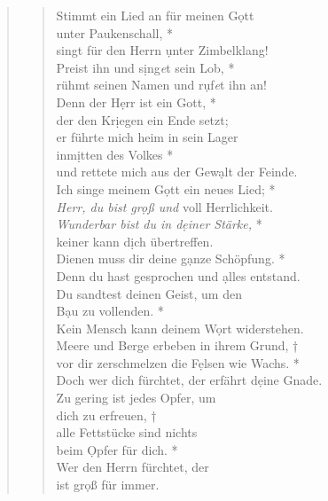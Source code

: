 \begin{quote}
\begin{verse}

Stimmt ein Lied an für meinen G\d ott\\
unter Paukenschall, *\\ 
\vin singt für den Herrn \d unter Zimbelklang! \\ 
\vin Preist ihn und s\d ing\textit{e}t sein Lob, *\\  
rühmt seinen Namen und r\d uf\textit{e}t ihn an! \\
Denn der H\d err ist ein Gott, *\\ 
der den Kr\d iegen ein Ende setzt; \\ 
\vin er führte mich heim in sein Lager\\ 
\vin inm\d itten des Volkes *\\ 
\vin  und rettete mich aus der Gew\d alt der Feinde.\\  
Ich singe meinem G\d ott ein neues Lied; *\\ 
\textit{Herr, du bist gr\d oß und} voll Herrlichkeit.\\ 
\vin \textit{Wunderbar bist du in d\d einer Stärke,} *\\ 
\vin keiner kann d\d ich übertreffen.\\  
Dienen muss dir deine g\d anze Schöpfung. *\\ 
Denn du hast gesprochen und \d alles entstand.\\ 
\vin Du sandtest deinen Geist, um den \\ \vin B\d au zu vollenden.  *\\ 
\vin  Kein Mensch kann deinem W\d ort widerstehen.\\ 
Meere und Berge erbeben in ihrem Grund, †\\
vor dir zerschmelzen die F\d elsen wie Wachs. *\\  
Doch wer dich fürchtet, der erfährt d\d eine Gnade.\\ 
\vin Zu gering ist jedes Opfer, um \\ \vin dich zu erfreuen, †\\ 
\vin alle Fettstücke sind nichts \\ \vin beim \d Opfer für dich. *\\ 
\vin  Wer den Herrn fürchtet, der \\ \vin ist gr\d oß für immer.\\ 

\end{verse}
\end{quote}

